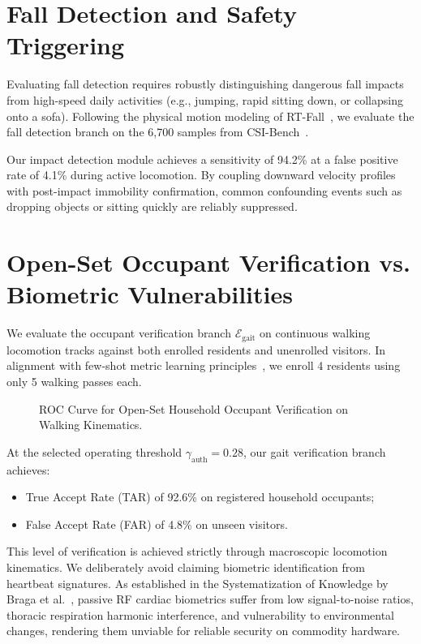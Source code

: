 \section{Fall Detection and Safety Triggering}
Evaluating fall detection requires robustly distinguishing dangerous fall impacts from high-speed daily activities (e.g., jumping, rapid sitting down, or collapsing onto a sofa). Following the physical motion modeling of RT-Fall~\cite{wang2017rt}, we evaluate the fall detection branch on the 6,700 samples from CSI-Bench~\cite{csi2025csi}.

Our impact detection module achieves a sensitivity of 94.2\% at a false positive rate of 4.1\% during active locomotion. By coupling downward velocity profiles with post-impact immobility confirmation, common confounding events such as dropping objects or sitting quickly are reliably suppressed.

\section{Open-Set Occupant Verification vs. Biometric Vulnerabilities}
We evaluate the occupant verification branch $\mathcal{E}_{\text{gait}}$ on continuous walking locomotion tracks against both enrolled residents and unenrolled visitors. In alignment with few-shot metric learning principles~\cite{author2022caution}, we enroll 4 residents using only 5 walking passes each.

\begin{figure}[ht]
\centering
\caption{ROC Curve for Open-Set Household Occupant Verification on Walking Kinematics.}
\label{fig:roc_verification}
\begin{center}
\fbox{\rule{0pt}{2in} \rule{0.9\linewidth}{0pt}}
\end{center}
\end{figure}

At the selected operating threshold $\gamma_{\text{auth}} = 0.28$, our gait verification branch achieves:
\begin{itemize}
    \item True Accept Rate (TAR) of 92.6\% on registered household occupants;
    \item False Accept Rate (FAR) of 4.8\% on unseen visitors.
\end{itemize}

This level of verification is achieved strictly through macroscopic locomotion kinematics. We deliberately avoid claiming biometric identification from heartbeat signatures. As established in the Systematization of Knowledge by Braga et al.~\cite{sok2024sok}, passive RF cardiac biometrics suffer from low signal-to-noise ratios, thoracic respiration harmonic interference, and vulnerability to environmental changes, rendering them unviable for reliable security on commodity hardware.

